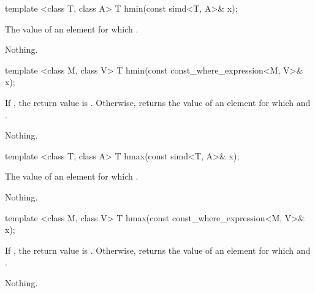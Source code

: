 \begin{itemdecl}
template <class T, class A> T hmin(const simd<T, A>& x);
\end{itemdecl}
\begin{itemdescr}
  \pnum\returns The value of an element  for which  \foralli.

  \pnum\throws Nothing.
\end{itemdescr}

\begin{itemdecl}
template <class M, class V> T hmin(const const_where_expression<M, V>& x);
\end{itemdecl}
\begin{itemdescr}
  \pnum\returns If , the return value is .
  Otherwise, returns the value of an element  for which  and  \foralli.

  \pnum\throws Nothing.
\end{itemdescr}

\begin{itemdecl}
template <class T, class A> T hmax(const simd<T, A>& x);
\end{itemdecl}
\begin{itemdescr}
  \pnum\returns The value of an element  for which  \foralli.

  \pnum\throws Nothing.
\end{itemdescr}

\begin{itemdecl}
template <class M, class V> T hmax(const const_where_expression<M, V>& x);
\end{itemdecl}
\begin{itemdescr}
  \pnum\returns If , the return value is .
  Otherwise, returns the value of an element  for which  and  \foralli.

  \pnum\throws Nothing.
\end{itemdescr}


